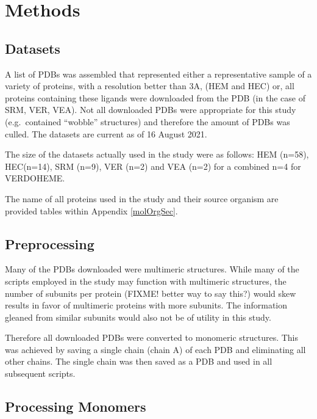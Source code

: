 \documentclass[a4paper, nobind]{templates/ociamthesis}
\begin{document}
\adjustmtc
{}

\hypertarget{methods}{%
\chapter{Methods}\label{methods}}

\hypertarget{datasets}{%
\section{Datasets}\label{datasets}}

\noindent A list of PDBs was assembled that represented either a representative sample of a variety of proteins, with a resolution better than 3A, (HEM and HEC) or, all proteins containing these ligands were downloaded from the PDB (in the case of SRM, VER, VEA). Not all downloaded PDBs were appropriate for this study (e.g.~contained ``wobble'' structures) and therefore the amount of PDBs was culled. The datasets are current as of 16 August 2021.

The size of the datasets actually used in the study were as follows: HEM (n=58), HEC(n=14), SRM (n=9), VER (n=2) and VEA (n=2) for a combined n=4 for VERDOHEME.

The name of all proteins used in the study and their source organism are provided tables within Appendix \ref{molOrgSec}.

\hypertarget{preprocessing}{%
\section{Preprocessing}\label{preprocessing}}

Many of the PDBs downloaded were multimeric structures. While many of the scripts employed in the study may function with multimeric structures, the number of subunits per protein (FIXME! better way to say this?) would skew results in favor of multimeric proteins with more subunits. The information gleaned from similar subunits would also not be of utility in this study.

Therefore all downloaded PDBs were converted to monomeric structures. This was achieved by saving a single chain (chain A) of each PDB and eliminating all other chains. The single chain was then saved as a PDB and used in all subsequent scripts.

\hypertarget{processing-monomers}{%
\section{Processing Monomers}\label{processing-monomers}}
\end{document}
